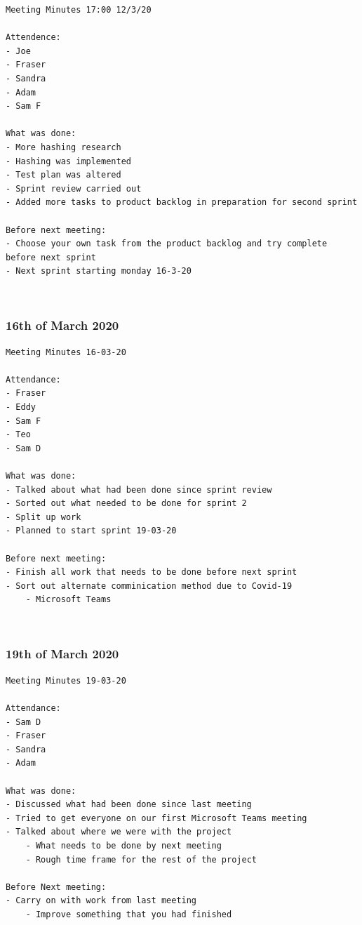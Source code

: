 \documentclass[10pt, notitlepage]{report}
\begin{document}
\begin{lstlisting}
Meeting Minutes 17:00 12/3/20

Attendence:
- Joe
- Fraser 
- Sandra
- Adam
- Sam F

What was done:
- More hashing research 
- Hashing was implemented
- Test plan was altered
- Sprint review carried out
- Added more tasks to product backlog in preparation for second sprint

Before next meeting:
- Choose your own task from the product backlog and try complete before next sprint
- Next sprint starting monday 16-3-20
\end{lstlisting}

\leavevmode \\
\subsubsection{16th of March 2020}

\begin{lstlisting}
Meeting Minutes 16-03-20

Attendance:
- Fraser
- Eddy
- Sam F
- Teo
- Sam D

What was done:
- Talked about what had been done since sprint review
- Sorted out what needed to be done for sprint 2
- Split up work
- Planned to start sprint 19-03-20

Before next meeting:
- Finish all work that needs to be done before next sprint
- Sort out alternate comminication method due to Covid-19
	- Microsoft Teams
\end{lstlisting}

\leavevmode \\
\subsubsection{19th of March 2020}

\begin{lstlisting}
Meeting Minutes 19-03-20

Attendance:
- Sam D
- Fraser
- Sandra
- Adam

What was done: 
- Discussed what had been done since last meeting
- Tried to get everyone on our first Microsoft Teams meeting
- Talked about where we were with the project
	- What needs to be done by next meeting
	- Rough time frame for the rest of the project

Before Next meeting:
- Carry on with work from last meeting
	- Improve something that you had finished
\end{lstlisting}
\end{document}
